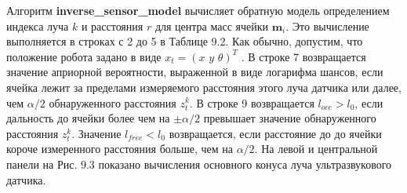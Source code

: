 \documentclass[10pt,a4paper]{article}
\begin{document}
Алгоритм \textbf{inverse\_sensor\_model} вычисляет обратную модель определением индекса луча $k$ и расстояния $r$ для центра масс ячейки $\textbf{m}_i$. Это вычисление выполняется в строках с 2 до 5 в Таблице 9.2. Как обычно, допустим, что положение робота задано в виде $x_t = (x\,\,y\,\,\theta)^T$ . В строке 7 возвращается значение априорной вероятности, выраженной в виде логарифма шансов, если ячейка лежит за пределами измеряемого расстояния этого луча датчика или   далее, чем $\alpha/2$ обнаруженного расстояния $z_t^k$. В строке 9 возвращается $l_{occ}>l_0$, если дальность до ячейки более чем на $\pm\alpha/2$ превышает значение обнаруженного расстояния $z_t^k$. Значение $l_{free}<l_0$ возвращается, если расстояние до до ячейки короче измеренного расстояния больше, чем на $\alpha/2$. На левой и центральной панели на Рис. 9.3 показано вычисления основного конуса луча ультразвукового датчика.
\end{document}
